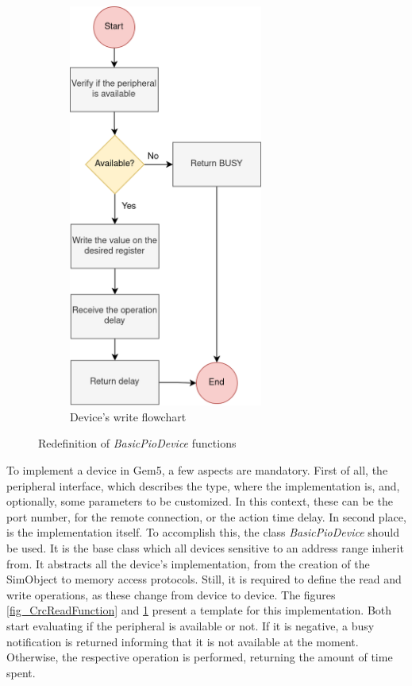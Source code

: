 \begin{figure}[t!]
\begin{subfigure}{0.4\textwidth}
		\includegraphics[width=0.7\textwidth]{Images/CrcWriteFunction.png}
		\caption[1\textwidth]{Device's write flowchart}
		\label{fig_CrcWriteFunction}
	\end{subfigure}
		
	\caption{Redefinition of \textit{BasicPioDevice} functions}
	\label{fig_Gem5ReadWrite}
\end{figure}
 
To implement a device in Gem5, a few aspects are mandatory. First of all, the peripheral interface, which describes the type, 
where the implementation is, and, optionally, some parameters to be customized. In this context, these can be
the port number, for the remote connection, or the action time delay. 
In second place, is the implementation itself. To accomplish this, the class \textit{BasicPioDevice} should be used. It is the base class 
which all devices sensitive to an address range inherit from. It abstracts all the device's implementation, from the creation of the SimObject 
to memory access protocols. Still, it is required to define the read and write operations, as these change from device to device. 
The figures \ref{fig_CrcReadFunction} and \ref{fig_CrcWriteFunction} present a template for this implementation. Both start evaluating if
the peripheral is available or not. If it is negative, a busy notification is returned informing that it is not available at the 
moment. Otherwise, the respective operation is performed, returning the amount of time spent.

